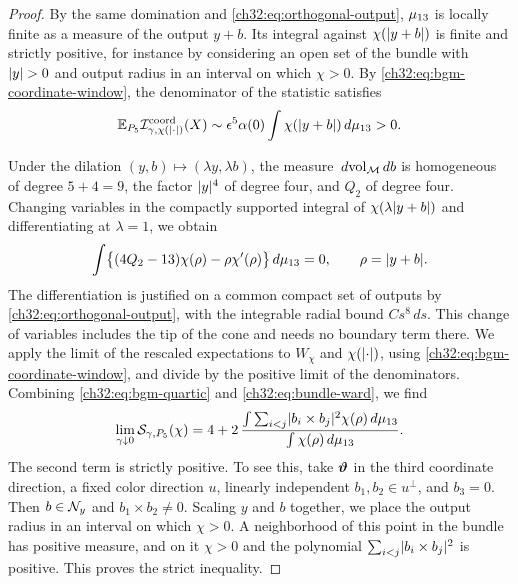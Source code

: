 \begin{proof}
By the same domination and \eqref{ch32:eq:orthogonal-output}, $\mu_{13}$ is locally finite as a measure of the output $y+b$. Its integral against $\chi(\lvert y+b\rvert)$ is finite and strictly positive, for instance by considering an open set of the bundle with $\lvert y\rvert>0$ and output radius in an interval on which $\chi>0$. By \eqref{ch32:eq:bgm-coordinate-window}, the denominator of the statistic satisfies
\[
 \mathbb E_{P_5}\mathcal I^{\mathrm{coord}}_{\gamma,\chi(\lvert \cdot\rvert)}(X)\sim\epsilon^5\alpha(0)\int\chi(\lvert y+b\rvert)\,d\mu_{13}>0.
\]

Under the dilation $(y,b)\mapsto(\lambda y,\lambda b)$, the measure $\,d\mathrm{vol}_{\mathcal M}\,db$ is homogeneous of degree $5+4=9$, the factor $\lvert y\rvert^4$ of degree four, and $Q_2$ of degree four. Changing variables in the compactly supported integral of $\chi(\lambda\lvert y+b\rvert)$ and differentiating at $\lambda=1$, we obtain
\begin{equation}\label{ch32:eq:bundle-ward}
 \int\bigl\{(4Q_2-13)\chi(\rho)-\rho\chi'(\rho)\bigr\}\,d\mu_{13}=0,\qquad\rho=\lvert y+b\rvert.
\end{equation}
The differentiation is justified on a common compact set of outputs by \eqref{ch32:eq:orthogonal-output}, with the integrable radial bound $Cs^8\,ds$. This change of variables includes the tip of the cone and needs no boundary term there. We apply the limit of the rescaled expectations to $W_\chi$ and $\chi(\lvert \cdot\rvert)$, using \eqref{ch32:eq:bgm-coordinate-window}, and divide by the positive limit of the denominators. Combining \eqref{ch32:eq:bgm-quartic} and \eqref{ch32:eq:bundle-ward}, we find
\[
 \lim_{\gamma\downarrow0}\mathcal S_{\gamma,P_5}(\chi)=4+2\,\frac{\int\sum_{i<j}\lvert b_i\times b_j\rvert^2\chi(\rho)\,d\mu_{13}}{\int\chi(\rho)\,d\mu_{13}}.
\]
The second term is strictly positive. To see this, take $\bm\vartheta$ in the third coordinate direction, a fixed color direction $u$, linearly independent $b_1,b_2\in u^\perp$, and $b_3=0$. Then $b\in\mathcal N_{y}$ and $b_1\times b_2\ne0$. Scaling $y$ and $b$ together, we place the output radius in an interval on which $\chi>0$. A neighborhood of this point in the bundle has positive measure, and on it $\chi>0$ and the polynomial $\sum_{i<j}\lvert b_i\times b_j\rvert^2$ is positive. This proves the strict inequality.
\end{proof}

